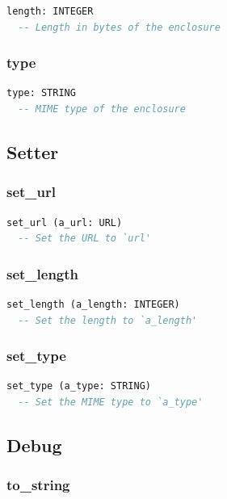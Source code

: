 \begin{lstlisting}[language=Eiffel]
length: INTEGER
  -- Length in bytes of the enclosure
\end{lstlisting}

\subsubsection{type}

\begin{lstlisting}[language=Eiffel]
type: STRING
  -- MIME type of the enclosure
\end{lstlisting}

\subsection{Setter}
\label{sec:item-enclosure-setter}

\subsubsection{set\_url}

\begin{lstlisting}[language=Eiffel]
set_url (a_url: URL)
  -- Set the URL to `url'
\end{lstlisting}

\subsubsection{set\_length}

\begin{lstlisting}[language=Eiffel]
set_length (a_length: INTEGER)
  -- Set the length to `a_length'
\end{lstlisting}

\subsubsection{set\_type}

\begin{lstlisting}[language=Eiffel]
set_type (a_type: STRING)
  -- Set the MIME type to `a_type'
\end{lstlisting}

\subsection{Debug}
\label{sec:item-enclosure-debug}

\subsubsection{to\_string}

